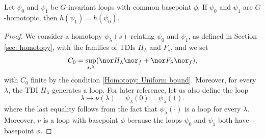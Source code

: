\begin{proposition} \label{prop: homotopy invariance products}
	Let $\psi_0$ and $\psi_1$ be $G$-invariant loops with common basepoint $\phi$. If  $\psi_0$ and $\psi_1$ are $G$-homotopic, then $h(\psi_1)=h(\psi_0)$.
\end{proposition}
\begin{proof}
	We consider a homotopy $\psi_\lambda(s)$ relating $\psi_0$ and $\psi_1$, as defined in Section \ref{sec: homotopy}, with the families of TDIs $H_\lambda$ and $F_s$,  and we set
	$$
	C_0= \sup_{s,\lambda} ( \nor H_\lambda \nor_f+ \nor F_\lambda \nor_f ),
	$$
	with $C_0$ finite by the condition \eqref{Homotopy: Uniform bound}.
	Moreover,  for every $\lambda$, the TDI  $H_\lambda$ generates a loop.
	For later reference, let us also define the loop 
	\begin{equation}\label{eq: funny loop nu}
		\lambda\mapsto \nu(\lambda)= \psi_\lambda(0)=\psi_\lambda(1).
	\end{equation}
	where the last equality follows from the fact that $\psi_\lambda(\cdot)$ is a loop for every $\lambda$. Moreover, $\nu$ is a loop with basepoint $\phi$ because the loops $\psi_0$ and $\psi_1$ both have basepoint $\phi$.
	

\end{proof}
